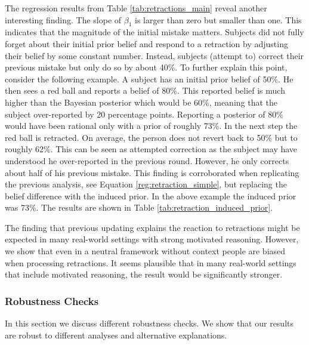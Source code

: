 \documentclass{article}
\begin{document}
The regression results from Table \ref{tab:retractions_main} reveal another interesting finding. The slope of $\beta_1$ is larger than zero but smaller than one. This indicates that the magnitude of the initial mistake matters. Subjects did not fully forget about their initial prior belief and respond to a retraction by adjusting their belief by some constant number. Instead, subjects (attempt to) correct their previous mistake but only do so by about 40\%. To further explain this point, consider the following example. A subject has an initial prior belief of 50\%. He then sees a red ball and reports a belief of 80\%. This reported belief is much higher than the Bayesian posterior which would be 60\%, meaning that the subject over-reported by 20 percentage points. Reporting a posterior of 80\% would have been rational only with a prior of roughly 73\%. In the next step the red ball is retracted. On average, the person does not revert back to 50\% but to roughly 62\%. This can be seen as attempted correction as the subject may have understood he over-reported in the previous round. However, he only corrects about half of his previous mistake. This finding is corroborated when replicating the previous analysis, see Equation \ref{reg:retraction_simple}, but replacing the belief difference with the induced prior. In the above example the induced prior was 73\%. The results are shown in Table \ref{tab:retraction_induced_prior}.

The finding that previous updating explains the reaction to retractions might be expected in many real-world settings with strong motivated reasoning. However, we show that even in a neutral framework without context people are biased when processing retractions. It seems plausible that in many real-world settings that include motivated reasoning, the result would be significantly stronger.


\subsubsection{Robustness Checks} \label{sec:robustness_retractions}

In this section we discuss different robustness checks. We show that our results are robust to different analyses and alternative explanations.
\end{document}
